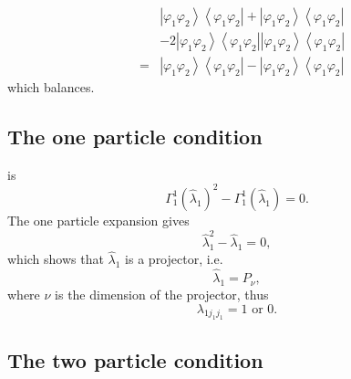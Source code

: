 \documentclass[12pt]{article}
\begin{document}
\begin{eqnarray*}
&&\left\vert \varphi _{1}\varphi _{2}\right\rangle \left\langle \varphi
_{1}\varphi _{2}\right\vert +\left\vert \varphi _{1}\varphi
_{2}\right\rangle \left\langle \varphi _{1}\varphi _{2}\right\vert \\
&&-2\left\vert \varphi _{1}\varphi _{2}\right\rangle \left\langle \varphi
_{1}\varphi _{2}\right\vert \left\vert \varphi _{1}\varphi _{2}\right\rangle
\left\langle \varphi _{1}\varphi _{2}\right\vert \\
&=&\left\vert \varphi _{1}\varphi _{2}\right\rangle \left\langle \varphi
_{1}\varphi _{2}\right\vert -\left\vert \varphi _{1}\varphi
_{2}\right\rangle \left\langle \varphi _{1}\varphi _{2}\right\vert
\end{eqnarray*}%
which balances.

\subsection{The one particle condition}

is 
\begin{equation*}
\Gamma _{1}^{1}\left( \hat{\lambda}_{1}\right) ^{2}-\Gamma _{1}^{1}\left( 
\hat{\lambda}_{1}\right) =0.
\end{equation*}%
The one particle expansion gives 
\begin{equation*}
\hat{\lambda}_{1}^{2}-\hat{\lambda}_{1}=0,
\end{equation*}%
which shows that $\hat{\lambda}_{1}$ is a projector, i.e. 
\begin{equation*}
\hat{\lambda}_{1}=P_{\nu },
\end{equation*}%
where $\nu $ is the dimension of the projector, thus 
\begin{equation*}
\lambda _{1j_{1}j_{1}}=1\text{ or }0.
\end{equation*}

\subsection{The two particle condition}
\end{document}
